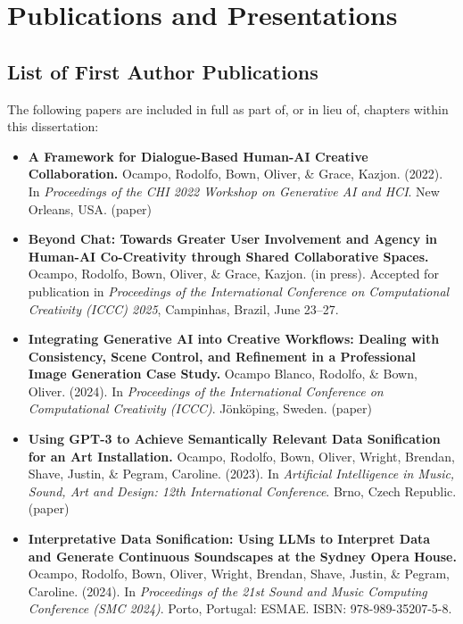 \chapter{Publications and Presentations}

\section*{List of First Author Publications}

The following papers are included in full as part of, or in lieu of, chapters within this dissertation:

\begin{itemize}

\item \textbf{A Framework for Dialogue-Based Human-AI Creative Collaboration.} Ocampo, Rodolfo, Bown, Oliver, \& Grace, Kazjon. (2022). In \textit{Proceedings of the CHI 2022 Workshop on Generative AI and HCI}. New Orleans, USA. (paper)

\item \textbf{Beyond Chat: Towards Greater User Involvement and Agency in Human-AI Co-Creativity through Shared Collaborative Spaces.} Ocampo, Rodolfo, Bown, Oliver, \& Grace, Kazjon. (in press). Accepted for publication in \textit{Proceedings of the International Conference on Computational Creativity (ICCC) 2025}, Campinhas, Brazil, June 23–27.

\item \textbf{Integrating Generative AI into Creative Workflows: Dealing with Consistency, Scene Control, and Refinement in a Professional Image Generation Case Study.} Ocampo Blanco, Rodolfo, \& Bown, Oliver. (2024). In \textit{Proceedings of the International Conference on Computational Creativity (ICCC)}. Jönköping, Sweden. (paper)

\item \textbf{Using GPT-3 to Achieve Semantically Relevant Data Sonification for an Art Installation.} Ocampo, Rodolfo, Bown, Oliver, Wright, Brendan, Shave, Justin, \& Pegram, Caroline. (2023). In \textit{Artificial Intelligence in Music, Sound, Art and Design: 12th International Conference}. Brno, Czech Republic. (paper)

\item \textbf{Interpretative Data Sonification: Using LLMs to Interpret Data and Generate Continuous Soundscapes at the Sydney Opera House.} Ocampo, Rodolfo, Bown, Oliver, Wright, Brendan, Shave, Justin, \& Pegram, Caroline. (2024). In \textit{Proceedings of the 21st Sound and Music Computing Conference (SMC 2024)}. Porto, Portugal: ESMAE. ISBN: 978-989-35207-5-8.


\end{itemize}




